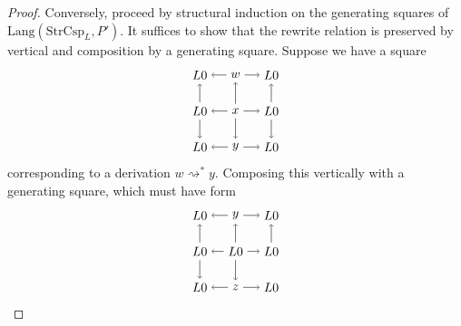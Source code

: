 \documentclass{amsart}
\newcommand{\StrCsp}{\cat{StrCsp}}
\newcommand{\Lang}{\mathrm{Lang}}
\newcommand{\cat}[1]{\mathrm{#1}}
\newcommand{\deriv}[2]{#1 \rightsquigarrow^\ast #2}
\theoremstyle{remark}
\theoremstyle{definition}
\begin{document}
\begin{proof}
  Conversely, proceed by structural induction on the generating
  squares of $ \Lang ( \StrCsp_L , P' ) $.  It suffices to show that
  the rewrite relation is preserved by vertical and composition by a
  generating square.  Suppose we have a square
  \[
    \begin{tikzpicture}
      \node (1t) at (0,2) {$ L 0 $};
      \node (2t) at (1,2) {$ w $};
      \node (3t) at (2,2) {$ L 0 $};
      \node (1m) at (0,1) {$ L 0 $};
      \node (2m) at (1,1) {$ x $};
      \node (3m) at (2,1) {$ L 0 $};
      \node (1b) at (0,0) {$ L 0 $};
      \node (2b) at (1,0) {$ y $};
      \node (3b) at (2,0) {$ L 0 $};
      \draw [->] (2t) to node [] {\scriptsize{$  $}} (1t);
      \draw [->] (2t) to node [] {\scriptsize{$  $}} (3t);
      \draw [->] (2m) to node [] {\scriptsize{$  $}} (1m);
      \draw [->] (2m) to node [] {\scriptsize{$  $}} (3m);
      \draw [->] (2b) to node [] {\scriptsize{$  $}} (1b);
      \draw [->] (2b) to node [] {\scriptsize{$  $}} (3b);
      \draw [->] (1m) to node [] {\scriptsize{$  $}} (1t);
      \draw [->] (2m) to node [] {\scriptsize{$  $}} (2t);
      \draw [->] (3m) to node [] {\scriptsize{$  $}} (3t);
      \draw [->] (1m) to node [] {\scriptsize{$  $}} (1b);
      \draw [->] (2m) to node [] {\scriptsize{$  $}} (2b);
      \draw [->] (3m) to node [] {\scriptsize{$  $}} (3b);
    \end{tikzpicture}
  \]
  corresponding to a derivation $ \deriv{w}{y} $. Composing this
  vertically with a generating square, which must have form
  \[
    \begin{tikzpicture}
      \node (1t) at (0,2) {$ L 0 $};
      \node (2t) at (1,2) {$ y $};
      \node (3t) at (2,2) {$ L 0 $};
      \node (1m) at (0,1) {$ L 0 $};
      \node (2m) at (1,1) {$ L 0 $};
      \node (3m) at (2,1) {$ L 0 $};
      \node (1b) at (0,0) {$ L 0 $};
      \node (2b) at (1,0) {$ z $};
      \node (3b) at (2,0) {$ L 0 $};
      \draw [->] (2t) to node [] {\scriptsize{$  $}} (1t);
      \draw [->] (2t) to node [] {\scriptsize{$  $}} (3t);
      \draw [->] (2m) to node [] {\scriptsize{$  $}} (1m);
      \draw [->] (2m) to node [] {\scriptsize{$  $}} (3m);
      \draw [->] (2b) to node [] {\scriptsize{$  $}} (1b);
      \draw [->] (2b) to node [] {\scriptsize{$  $}} (3b);
      \draw [->] (1m) to node [] {\scriptsize{$  $}} (1t);
      \draw [->] (2m) to node [] {\scriptsize{$  $}} (2t);
      \draw [->] (3m) to node [] {\scriptsize{$  $}} (3t);
      \draw [->] (1m) to node [] {\scriptsize{$  $}} (1b);
      \draw [->] (2m) to node [] {\scriptsize{$  $}} (2b);

\end{tikzpicture}\]
\end{proof}
\end{document}
